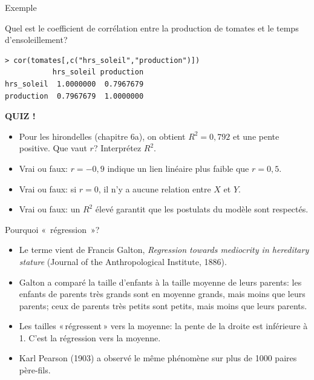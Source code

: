 \documentclass{BeamerTemplate}
\begin{document}
\begin{frame}[fragile,t]{Exemple}

Quel est le coefficient de corrélation entre la production de tomates et le
temps d'ensoleillement?

\vspace{3cm}
\begin{Verbatim}[fontsize=\small]
> cor(tomates[,c("hrs_soleil","production")])
           hrs_soleil production
hrs_soleil  1.0000000  0.7967679
production  0.7967679  1.0000000
\end{Verbatim}

\end{frame}

\begin{frame}[plain,t]
  \centerline{\LARGE\bfseries\alert{QUIZ !}}

  \medskip
  \begin{itemize}\itemsep 1cm
    \item Pour les hirondelles (chapitre 6a), on obtient $R^2=0{,}792$ et une pente
    positive. Que vaut $r$? Interprétez $R^2$.
    \item<2-> Vrai ou faux: $r=-0{,}9$ indique un lien linéaire plus faible que
    $r=0{,}5$.
    \item<3-> Vrai ou faux: si $r=0$, il n'y a aucune relation entre $X$ et $Y$.
    \item<4-> Vrai ou faux: un $R^2$ élevé garantit que les postulats du modèle
    sont respectés.
  \end{itemize}
\end{frame}

\begin{frame}[t]{Pourquoi «~régression~»?}

\begin{itemize}\itemsep3mm
  \item Le terme vient de Francis Galton, \textit{Regression towards mediocrity in
  hereditary stature} (Journal of the Anthropological Institute, 1886).
  \item<2-> Galton a comparé la taille d'enfants à la taille moyenne de leurs parents:
  les enfants de parents très grands sont en moyenne grands, mais \alert{moins}
  que leurs parents; ceux de parents très petits sont petits, mais moins que leurs
  parents.
  \item<3-> Les tailles «\,régressent\,» vers la moyenne: la pente de la droite
  est inférieure à 1. C'est la \alert{régression vers la moyenne}.
  \item<4-> Karl Pearson (1903) a observé le même phénomène sur plus de 1000 paires
  père-fils.
\end{itemize}

\end{frame}
\end{document}
